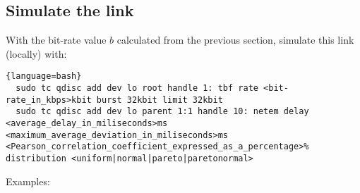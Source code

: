 \subsection{Simulate the link}
With the bit-rate value $b$ calculated from the previous section, simulate
this link (locally) with:

\begin{lstlisting}{language=bash}
  sudo tc qdisc add dev lo root handle 1: tbf rate <bit-rate_in_kbps>kbit burst 32kbit limit 32kbit
  sudo tc qdisc add dev lo parent 1:1 handle 10: netem delay <average_delay_in_miliseconds>ms <maximum_average_deviation_in_miliseconds>ms <Pearson_correlation_coefficient_expressed_as_a_percentage>% distribution <uniform|normal|pareto|paretonormal>
\end{lstlisting}

Examples:


